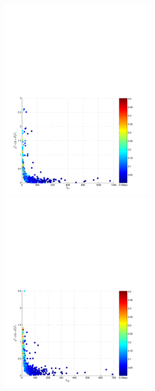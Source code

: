 \begin{figure}[p]
\begin{center}
\includegraphics[width=0.7\textwidth]{figures/result/l1_inj_snr_final}\\
\includegraphics[width=0.7\textwidth]{figures/result/h1_inj_snr_final}
\end{center}
\caption[Signal-to-noise ratio and $\chi^2$-veto for Injected Signals]{%
}
\end{figure}
